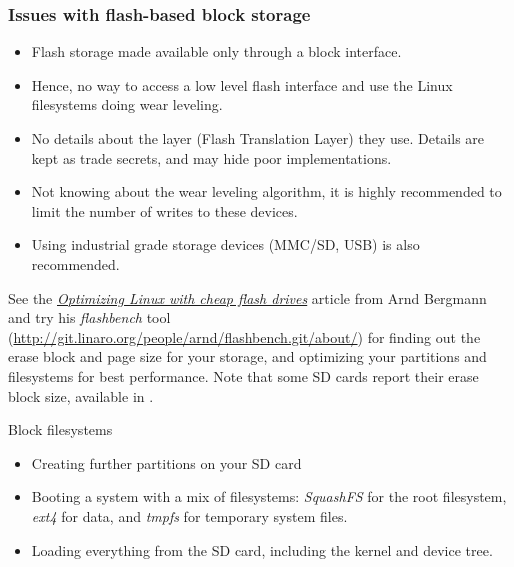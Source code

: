 \begin{frame}
  \frametitle{Issues with flash-based block storage}
  \begin{itemize}
  \item Flash storage made available only through a block interface.
  \item Hence, no way to access a low level flash interface
    and use the Linux filesystems doing wear leveling.
  \item No details about the layer (Flash Translation Layer) they
    use. Details are kept as trade secrets, and may hide poor
    implementations.
  \item Not knowing about the wear leveling algorithm, it is highly
    recommended to limit the number of writes to these devices.
  \item Using industrial grade storage devices (MMC/SD, USB) is
    also recommended.
  \end{itemize}
  See the \href{https://lwn.net/Articles/428584/}{\em Optimizing Linux with
  cheap flash drives} article from Arnd Bergmann and try his {\em
  flashbench} tool (\url{http://git.linaro.org/people/arnd/flashbench.git/about/})
  for finding out the erase block and page size for your storage, and
  optimizing your partitions and filesystems for best performance.
  Note that some SD cards report their erase block size, available in
  .
\end{frame}

\setuplabframe
{Block filesystems}
{
  \begin{itemize}
  \item Creating further partitions on your SD card
  \item Booting a system with a mix of filesystems: {\em SquashFS} for
    the root filesystem, {\em ext4} for data, and {\em
    tmpfs} for temporary system files.
  \item Loading everything from the SD card, including
    the kernel and device tree.
  \end{itemize}
}
